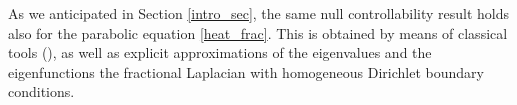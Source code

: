 As we anticipated in Section \ref{intro_sec}, the same null controllability result holds also for the parabolic equation \eqref{heat_frac}. This is obtained by means of classical tools (\cite{fattorini1971exact}), as well as explicit approximations of the eigenvalues and the eigenfunctions the fractional Laplacian with homogeneous Dirichlet boundary conditions. 


